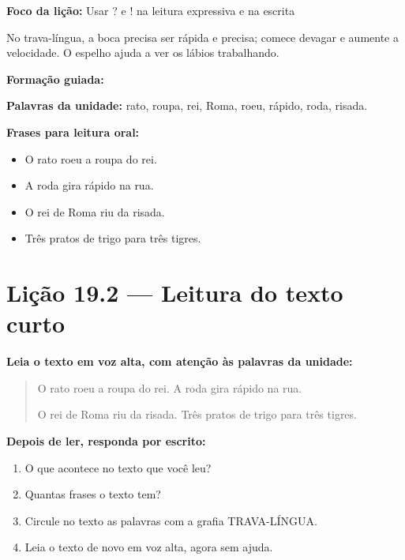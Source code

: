 \textbf{Foco da lição:} Usar ? e ! na leitura expressiva e na escrita


\begin{boquinha}
No trava-língua, a boca precisa ser rápida e precisa; comece devagar e aumente a velocidade. O espelho ajuda a ver os lábios trabalhando.
\end{boquinha}

\noindent\textbf{Formação guiada:}

\begin{center}
\end{center}

\noindent\textbf{Palavras da unidade:} rato, roupa, rei, Roma, roeu, rápido, roda, risada.

\noindent\textbf{Frases para leitura oral:}
\begin{itemize}[leftmargin=1.6em]
  \item O rato roeu a roupa do rei.
  \item A roda gira rápido na rua.
  \item O rei de Roma riu da risada.
  \item Três pratos de trigo para três tigres.
\end{itemize}

\section{Lição 19.2 --- Leitura do texto curto}

\noindent\textbf{Leia o texto em voz alta, com atenção às palavras da unidade:}


\begin{quote}
O rato roeu a roupa do rei. A roda gira rápido na rua.

O rei de Roma riu da risada. Três pratos de trigo para três tigres.
\end{quote}

\textbf{Depois de ler, responda por escrito:}
\begin{enumerate}

  \item O que acontece no texto que você leu?
  \begin{center}
  \underline{\hspace{12cm}}
  \end{center}

  \item Quantas frases o texto tem?
  \begin{center}
  \underline{\hspace{12cm}}
  \end{center}

  \item Circule no texto as palavras com a grafia TRAVA-LÍNGUA.

  \item Leia o texto de novo em voz alta, agora sem ajuda.

\end{enumerate}

